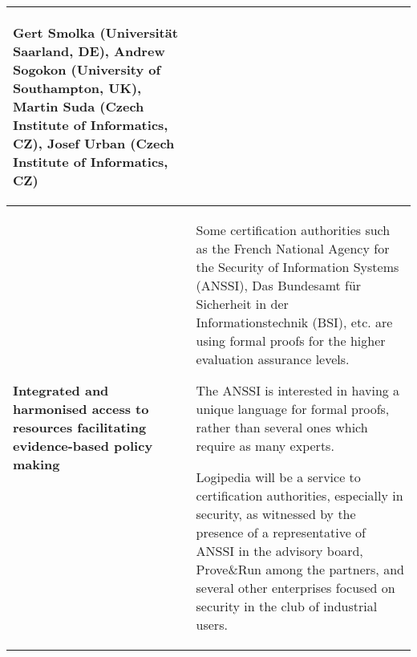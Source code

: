 \begin{longtable}{|p{}|p{}|}
\begin{shaded}
Gert Smolka (Universität Saarland, DE),
Andrew Sogokon (University of Southampton, UK),
Martin Suda (Czech Institute of Informatics, CZ),
Josef Urban (Czech Institute of Informatics, CZ)
\end{shaded}
\\
\hline {\bf Integrated and harmonised access to resources facilitating
  evidence-based policy making} & Some certification authorities such
as the French National Agency for the Security of Information Systems
(ANSSI), Das Bundesamt für Sicherheit in der Informationstechnik (BSI), etc.
are using formal proofs for the higher evaluation assurance levels. 

The ANSSI is interested in having a unique language for formal proofs,
rather than several ones which require as many experts.

Logipedia will be a service to certification authorities, especially
in security, as witnessed by the presence of a representative of ANSSI
in the advisory board, Prove\&Run among the partners, and several
other enterprises focused on security in the club of industrial users.


\end{longtable}
